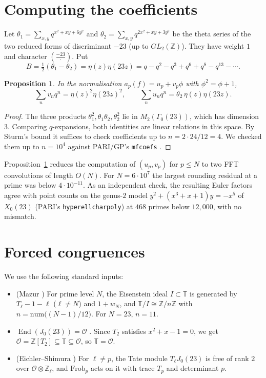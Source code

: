 \documentclass[11pt]{amsart}
\newtheorem{proposition}[theorem]{Proposition}
\theoremstyle{definition}
\theoremstyle{remark}
\newcommand{\Z}{\mathbb{Z}}
\newcommand{\cO}{\mathcal{O}}
\newcommand{\T}{\mathbb{T}}
\newcommand{\Frob}{\mathrm{Frob}}
\begin{document}
\section{Computing the coefficients}\label{sec:coeffs}

Let $\theta_1=\sum_{x,y}q^{x^2+xy+6y^2}$ and $\theta_2=\sum_{x,y}q^{2x^2+xy+3y^2}$ be the theta series of the two reduced forms of discriminant $-23$ (up to $GL_2(\Z)$). They have weight $1$ and character $\left(\frac{-23}{\cdot}\right)$. Put
\[
B=\tfrac12(\theta_1-\theta_2)=\eta(z)\eta(23z)=q-q^2-q^3+q^6+q^8-q^{13}-\cdots .
\]

\begin{proposition}\label{prop:eta}
In the normalisation $a_p(f)=u_p+v_p\phi$ with $\phi^2=\phi+1$,
\[
\sum_n v_nq^n=\eta(z)^2\eta(23z)^2,\qquad \sum_n u_nq^n=\theta_2\,\eta(z)\eta(23z).
\]
\end{proposition}

\begin{proof}
The three products $\theta_1^2,\theta_1\theta_2,\theta_2^2$ lie in $M_2(\Gamma_0(23))$, which has dimension $3$. Comparing $q$-expansions, both identities are linear relations in this space. By Sturm's bound \cite{Sturm} it suffices to check coefficients up to $n=2\cdot24/12=4$. We checked them up to $n=10^4$ against PARI/GP's \texttt{mfcoefs} \cite{PARI}.
\end{proof}

Proposition~\ref{prop:eta} reduces the computation of $(u_p,v_p)$ for $p\le N$ to two FFT convolutions of length $O(N)$. For $N=6\cdot10^7$ the largest rounding residual at a prime was below $4\cdot10^{-11}$. As an independent check, the resulting Euler factors agree with point counts on the genus-$2$ model $y^2+(x^3+x+1)y=-x^5$ of $X_0(23)$ (PARI's \texttt{hyperellcharpoly}) at $468$ primes below $12{,}000$, with no mismatch.

\section{Forced congruences}\label{sec:congr}

We use the following standard inputs:
\begin{itemize}
\item[(I1)] (Mazur \cite{Mazur}) For prime level $N$, the Eisenstein ideal $I\subset\T$ is generated by $T_\ell-1-\ell$ ($\ell\neq N$) and $1+w_N$, and $\T/I\cong\Z/n\Z$ with $n=\mathrm{num}\big((N-1)/12\big)$. For $N=23$, $n=11$.
\item[(I2)] $\operatorname{End}(J_0(23))=\cO$ \cite{Hashimoto,LMFDB}. Since $T_2$ satisfies $x^2+x-1=0$, we get $\cO=\Z[T_2]\subseteq\T\subseteq\cO$, so $\T=\cO$.
\item[(I3)] (Eichler--Shimura \cite{Shimura}) For $\ell\neq p$, the Tate module $T_\ell J_0(23)$ is free of rank $2$ over $\cO\otimes\Z_\ell$, and $\Frob_p$ acts on it with trace $T_p$ and determinant $p$.
\end{itemize}
\end{document}
